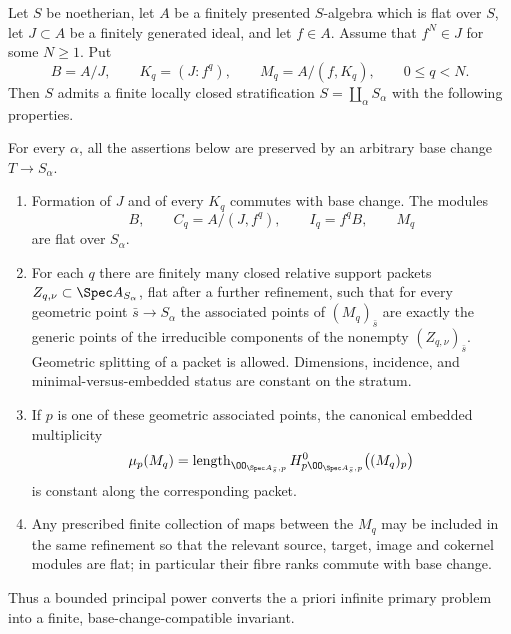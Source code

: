\begin{theorem}
\label{thm:bounded-principal-colon-stratification}
Let \(S\) be noetherian, let \(A\) be a finitely presented
\(S\)-algebra which is flat over \(S\), let \(J\subset A\) be a
finitely generated ideal, and let \(f\in A\).  Assume that
\(f^N\in J\) for some \(N\ge1\).  Put
\[
 B=A/J,\qquad
 K_q=(J:f^q),\qquad
 M_q=A/(f,K_q),\qquad 0\le q<N.
\]
Then \(S\) admits a finite locally closed stratification
\(S=\coprod_\alpha S_\alpha\) with the following properties.

For every \(\alpha\), all the assertions below are preserved by an
arbitrary base change \(T\to S_\alpha\).
\begin{enumerate}
\item Formation of \(J\) and of every \(K_q\) commutes with base
change.  The modules
\[
 B,\qquad C_q=A/(J,f^q),\qquad
 I_q=f^qB,\qquad M_q
\]
are flat over \(S_\alpha\).
\item For each \(q\) there are finitely many closed relative support
packets \(Z_{q,\nu}\subset\Spec A_{S_\alpha}\), flat after a further
refinement, such that for every geometric point \(\bar s\to S_\alpha\)
the associated points of \((M_q)_{\bar s}\) are exactly the generic
points of the irreducible components of the nonempty
\((Z_{q,\nu})_{\bar s}\).  Geometric splitting of a packet is allowed.
Dimensions, incidence, and minimal-versus-embedded status are constant
on the stratum.
\item If \(p\) is one of these geometric associated points, the
canonical embedded multiplicity
\[
 \mu_p(M_q)=
 \operatorname{length}_{\OO_{\Spec A_{\bar s},p}}
 H^0_{p\OO_{\Spec A_{\bar s},p}}\bigl((M_q)_p\bigr)
\]
is constant along the corresponding packet.
\item Any prescribed finite collection of maps between the \(M_q\)
may be included in the same refinement so that the relevant source,
target, image and cokernel modules are flat; in particular their
fibre ranks commute with base change.
\end{enumerate}
Thus a bounded principal power converts the a priori infinite
primary problem into a finite, base-change-compatible invariant.
\end{theorem}

